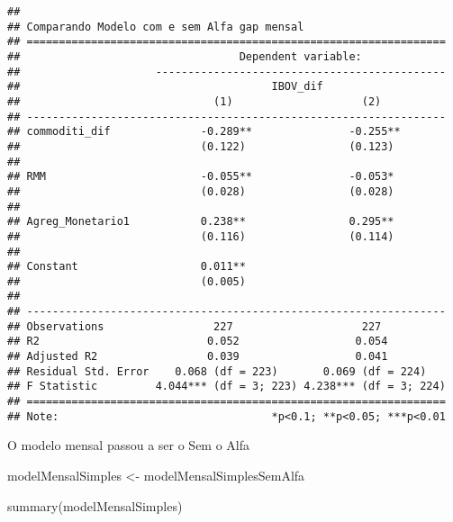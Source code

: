 \documentclass[
]{article}
\newenvironment{Shaded}{\begin{snugshade}}{\end{snugshade}}
\newcommand{\FunctionTok}[1]{\textcolor[rgb]{0.00,0.00,0.00}{#1}}
\newcommand{\NormalTok}[1]{#1}
\newcommand{\OtherTok}[1]{\textcolor[rgb]{0.56,0.35,0.01}{#1}}
\begin{document}
\begin{verbatim}
## 
## Comparando Modelo com e sem Alfa gap mensal
## =================================================================
##                                  Dependent variable:             
##                     ---------------------------------------------
##                                       IBOV_dif                   
##                              (1)                    (2)          
## -----------------------------------------------------------------
## commoditi_dif              -0.289**               -0.255**       
##                            (0.122)                (0.123)        
##                                                                  
## RMM                        -0.055**               -0.053*        
##                            (0.028)                (0.028)        
##                                                                  
## Agreg_Monetario1           0.238**                0.295**        
##                            (0.116)                (0.114)        
##                                                                  
## Constant                   0.011**                               
##                            (0.005)                               
##                                                                  
## -----------------------------------------------------------------
## Observations                 227                    227          
## R2                          0.052                  0.054         
## Adjusted R2                 0.039                  0.041         
## Residual Std. Error    0.068 (df = 223)       0.069 (df = 224)   
## F Statistic         4.044*** (df = 3; 223) 4.238*** (df = 3; 224)
## =================================================================
## Note:                                 *p<0.1; **p<0.05; ***p<0.01
\end{verbatim}

O modelo mensal passou a ser o Sem o Alfa

\begin{Shaded}
\begin{Highlighting}[]
\NormalTok{modelMensalSimples }\OtherTok{\textless{}{-}}\NormalTok{ modelMensalSimplesSemAlfa}

\FunctionTok{summary}\NormalTok{(modelMensalSimples)}
\end{Highlighting}
\end{Shaded}
\end{document}
